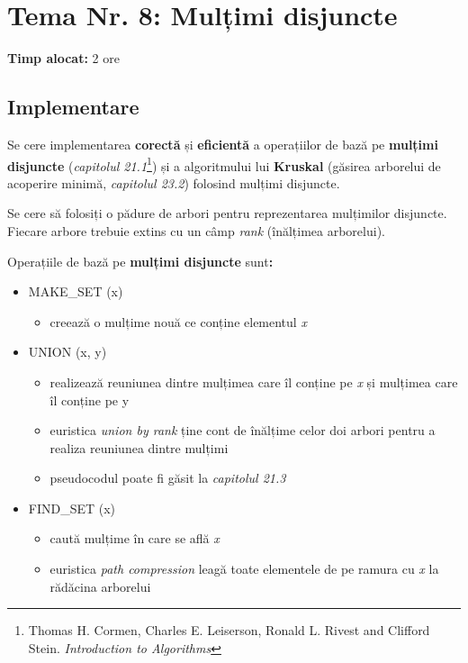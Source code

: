 \documentclass[../ro-fa-lab.tex]{subfiles}
\begin{document}
\section{\texorpdfstring{\textbf{Tema Nr. 8: Mulțimi disjuncte}}{Tema Nr. 8: Mulțimi disjuncte}}\label{assign8}

\textbf{Timp alocat:} 2 ore

\subsection{Implementare}\label{implementare}

Se cere implementarea \textbf{corectă} și \textbf{eficientă} a
operațiilor de bază pe \textbf{mulțimi disjuncte} (\emph{capitolul
21.1}\footnote{Thomas H. Cormen, Charles E. Leiserson, Ronald L. Rivest
  and Clifford Stein. \emph{Introduction to Algorithms}}) și a
algoritmului lui \textbf{Kruskal} (găsirea arborelui de acoperire
minimă, \emph{capitolul 23.2}\citep{cormen}) folosind mulțimi
disjuncte.

Se cere să folosiți o pădure de arbori pentru reprezentarea mulțimilor
disjuncte. Fiecare arbore trebuie extins cu un câmp \emph{rank}
(înălțimea arborelui).

Operațiile de bază pe \textbf{mulțimi disjuncte} sunt\textbf{:}

\begin{itemize}
\item
  MAKE\_SET (x)

  \begin{itemize}
  \item
    creează o mulțime nouă ce conține elementul \emph{x}
  \end{itemize}
\item
  UNION (x, y)

  \begin{itemize}
  \item
    realizează reuniunea dintre mulțimea care îl conține pe \emph{x} și
    mulțimea care îl conține pe y
  \item
    euristica \emph{union by rank} ține cont de înălțime celor doi
    arbori pentru a realiza reuniunea dintre mulțimi
  \item
    pseudocodul poate fi găsit la \emph{capitolul
    21.3}\citep{cormen}
  \end{itemize}
\item
  FIND\_SET (x)

  \begin{itemize}
  \item
    caută mulțime în care se află \emph{x}
  \item
    euristica \emph{path compression} leagă toate elementele de pe
    ramura cu \emph{x} la rădăcina arborelui
  \end{itemize}
\end{itemize}
\end{document}
